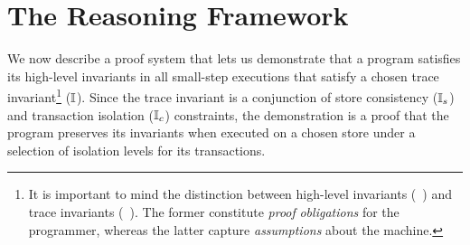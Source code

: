 \section{The Reasoning Framework}
\label{sec:reasoning}

We now describe a proof system that lets us demonstrate that a \txnimp
program satisfies its high-level invariants in all small-step
executions that satisfy a chosen trace invariant\footnote{It is
important to mind the distinction between high-level invariants
(\eg~) and trace invariants (\eg~). The former
constitute \emph{proof} \emph{obligations} for the programmer, whereas
the latter capture \emph{assumptions} about the machine. } ($\mathbb{I}$).
Since the trace invariant is a conjunction of store consistency
($\mathbb{I}_s$) and transaction isolation ($\mathbb{I}_c$) constraints, the
demonstration is a proof that the program preserves its invariants
when executed on a chosen store under a selection of isolation levels
for its transactions.

